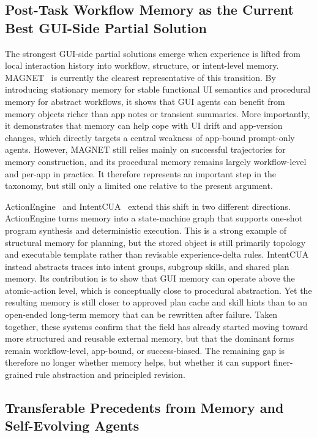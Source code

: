 \documentclass{article}
\begin{document}
\subsection{Post-Task Workflow Memory as the Current Best GUI-Side
Partial
Solution}\label{53-post-task-workflow-memory-as-the-current-best-gui-side-partial-solution}

The strongest GUI-side partial solutions emerge when experience is
lifted from local interaction history into workflow, structure, or
intent-level memory. MAGNET~\parencite{sun2026magnet} is currently the
clearest representative of this transition. By introducing stationary
memory for stable functional UI semantics and procedural memory for
abstract workflows, it shows that GUI agents can benefit from memory
objects richer than app notes or transient summaries. More importantly,
it demonstrates that memory can help cope with UI drift and app-version
changes, which directly targets a central weakness of app-bound
prompt-only agents. However, MAGNET still relies mainly on successful
trajectories for memory construction, and its procedural memory remains
largely workflow-level and per-app in practice. It therefore represents
an important step in the taxonomy, but still only a limited one
relative to the present argument.

ActionEngine~\parencite{zhong2026actionengine} and
IntentCUA~\parencite{lee2026intentcua} extend this shift in two
different directions. ActionEngine turns memory into a state-machine
graph that supports one-shot program synthesis and deterministic
execution. This is a strong example of structural memory for planning,
but the stored object is still primarily topology and executable
template rather than revisable experience-delta rules. IntentCUA
instead abstracts traces into intent groups, subgroup skills, and
shared plan memory. Its contribution is to show that GUI memory can
operate above the atomic-action level, which is conceptually close to
procedural abstraction. Yet the resulting memory is still closer to
approved plan cache and skill hints than to an open-ended long-term
memory that can be rewritten after failure. Taken together, these
systems confirm that the field has already started moving toward more
structured and reusable external memory, but that the dominant forms
remain workflow-level, app-bound, or success-biased. The remaining gap
is therefore no longer whether memory helps, but whether it can support
finer-grained rule abstraction and principled revision.

\subsection{Transferable Precedents from Memory and Self-Evolving
Agents}\label{54-transferable-precedents-from-memory-and-self-evolving-agents}
\end{document}
